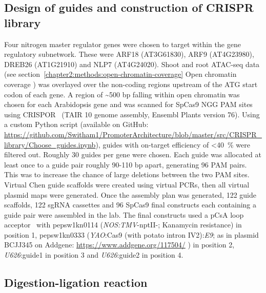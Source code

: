 \documentclass[../main.tex]{subfiles}
\begin{document}
\subsection{Design of guides and construction of CRISPR library}\label{chapter2:methods:design-of-guides}
Four nitrogen master regulator genes were chosen to target within the gene regulatory subnetwork.
These were ARF18 (AT3G61830), ARF9 (AT4G23980), DREB26 (AT1G21910) and NLP7 (AT4G24020).
Shoot and root ATAC-seq data (see section~\ref{chapter2:methods:open-chromatin-coverage} Open chromatin coverage \autocite{potterCytokininModulatesContextdependent2018}) was overlayed over the non-coding regions upstream of the ATG start codon of each gene.
A region of \textasciitilde{}500 bp falling within open chromatin was chosen for each Arabidopsis gene and was scanned for SpCas9 NGG PAM sites using CRISPOR~\autocite{concordetCRISPORIntuitiveGuide2018} (TAIR 10 \autocite{lameschArabidopsisInformationResource2012} genome assembly, Ensembl Plants \autocite{howeEnsemblGenomes20202020} version 76).
Using a custom Python \autocite{pythoncoreteamPythonDynamicOpen2020} script (available on GitHub: \url{https://github.com/Switham1/PromoterArchitecture/blob/master/src/CRISPR_library/Choose_guides.ipynb}), guides with on\hyp{}target efficiency \autocite{doenchOptimizedSgRNADesign2016} of <\SI{40}{\percent} were filtered out.
Roughly 30 guides per gene were chosen.
Each guide was allocated at least once to a guide pair roughly 90-110 bp apart, generating 96 PAM pairs.
This was to increase the chance of large deletions between the two PAM sites.
Virtual Chen \autocite{chenDynamicImagingGenomic2013} guide scaffolds were created using virtual PCRs, then all virtual plasmid maps were generated.
Once the assembly plan was generated, 122 guide scaffolds, 122 sgRNA cassettes and 96 SpCas9 final constructs each containing a guide pair were assembled in the lab.
The final constructs used a pCsA loop acceptor~\autocite{pollakLoopAssemblySimple2018} with pepsw1kn0114 (\textit{NOS:TMV}-nptII-; Kanamycin resistance) in position 1, pepsw1kn0333 (\textit{YAO}:Cas9 (with potato intron IV2):\textit{E9}; as in plasmid BCJJ345 on Addgene: \url{https://www.addgene.org/117504/} \autocite{castelOptimizationTDNAArchitecture2019}) in position 2, \textit{U626}:guide1 in position 3 and \textit{U626}:guide2 in position 4.

\subsection{Digestion-ligation reaction}\label{chapter2:methods:digestion-ligation-reaction}
\end{document}
